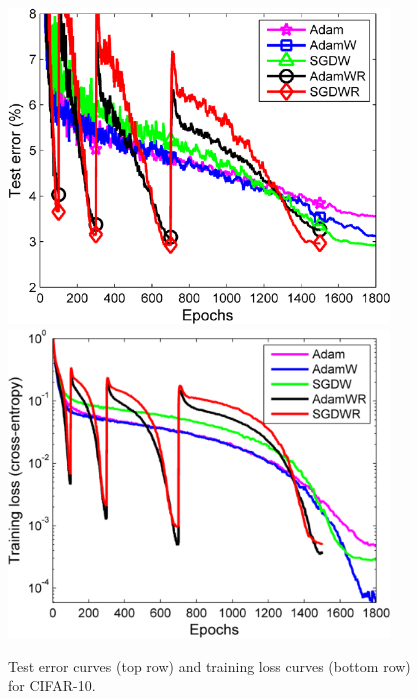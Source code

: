 \documentclass[usenames,dvipsnames]{article} %
\begin{document}

\begin{figure}[t]%
	\includegraphics[width=0.9\textwidth]{restarts} \\
  \includegraphics[width=0.9\textwidth]{cifar10_training}
\caption{\label{figtrainingCIFAR} Test error curves (top row) and training loss curves (bottom row) for CIFAR-10.}
\end{figure}
\end{document}
